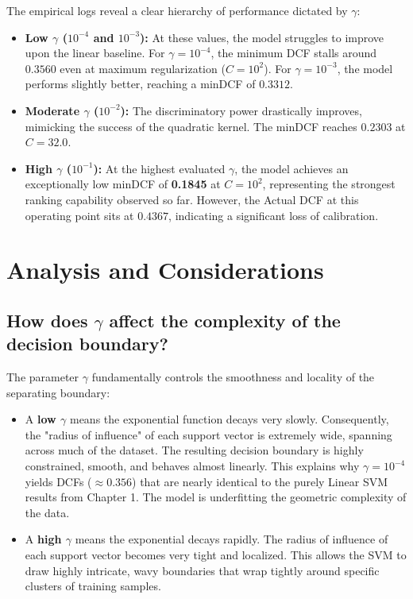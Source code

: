 The empirical logs reveal a clear hierarchy of performance dictated by $\gamma$:
\begin{itemize}
    \item \textbf{Low $\gamma$ ($10^{-4}$ and $10^{-3}$):} At these values, the model struggles to improve upon the linear baseline. For $\gamma = 10^{-4}$, the minimum DCF stalls around $0.3560$ even at maximum regularization ($C=10^2$). For $\gamma = 10^{-3}$, the model performs slightly better, reaching a minDCF of $0.3312$.
    \item \textbf{Moderate $\gamma$ ($10^{-2}$):} The discriminatory power drastically improves, mimicking the success of the quadratic kernel. The minDCF reaches $0.2303$ at $C=32.0$.
    \item \textbf{High $\gamma$ ($10^{-1}$):} At the highest evaluated $\gamma$, the model achieves an exceptionally low minDCF of \textbf{0.1845} at $C=10^2$, representing the strongest ranking capability observed so far. However, the Actual DCF at this operating point sits at $0.4367$, indicating a significant loss of calibration.
\end{itemize}

\section{Analysis and Considerations}

\subsection*{How does $\gamma$ affect the complexity of the decision boundary?}

The parameter $\gamma$ fundamentally controls the smoothness and locality of the separating boundary:
\begin{itemize}
    \item A \textbf{low $\gamma$} means the exponential function decays very slowly. Consequently, the "radius of influence" of each support vector is extremely wide, spanning across much of the dataset. The resulting decision boundary is highly constrained, smooth, and behaves almost linearly. This explains why $\gamma = 10^{-4}$ yields DCFs ($\approx 0.356$) that are nearly identical to the purely Linear SVM results from Chapter 1. The model is underfitting the geometric complexity of the data.
    \item A \textbf{high $\gamma$} means the exponential decays rapidly. The radius of influence of each support vector becomes very tight and localized. This allows the SVM to draw highly intricate, wavy boundaries that wrap tightly around specific clusters of training samples. 
\end{itemize}

